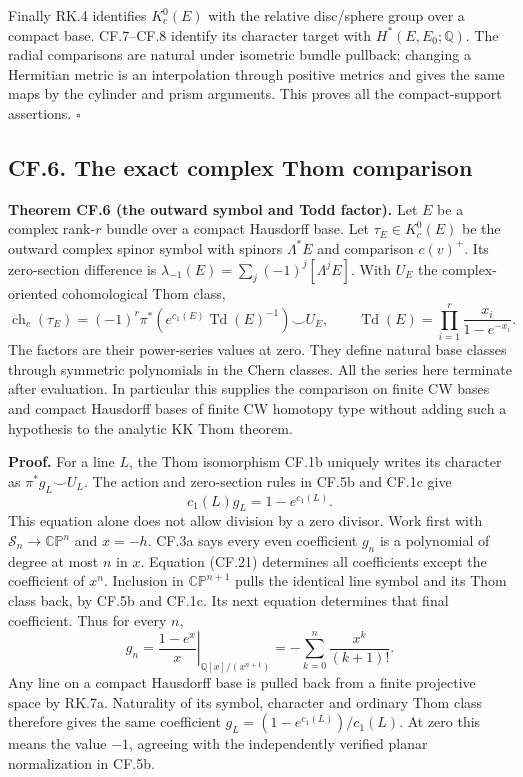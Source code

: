 \documentclass[
  11pt,
]{article}
\begin{document}
Finally RK.4 identifies \(K^0_c(E)\) with the relative disc/sphere group
over a compact base. CF.7--CF.8 identify its character target with
\(H^*(E,E_0;\mathbb Q)\). The radial comparisons are natural under
isometric bundle pullback; changing a Hermitian metric is an
interpolation through positive metrics and gives the same maps by the
cylinder and prism arguments. This proves all the compact-support
assertions. \(\square\)

\subsection{CF.6. The exact complex Thom
comparison}\label{cf.6.-the-exact-complex-thom-comparison}

\textbf{Theorem CF.6 (the outward symbol and Todd factor).} Let \(E\) be
a complex rank-\(r\) bundle over a compact Hausdorff base. Let
\(\tau_E\in K_c^0(E)\) be the outward complex spinor symbol with spinors
\(\Lambda^*E\) and comparison \(c(v)^+\). Its zero-section difference is
\(\lambda_{-1}(E)=\sum_j(-1)^j[\Lambda^jE]\). With \(U_E\) the
complex-oriented cohomological Thom class, \[
\operatorname{ch}_c(\tau_E)
=(-1)^r\pi^*\!\left(e^{c_1(E)}\operatorname{Td}(E)^{-1}\right)\smile U_E,
\qquad
\operatorname{Td}(E)=\prod_{i=1}^r\frac{x_i}{1-e^{-x_i}}.
\tag{CF.20}
\] The factors are their power-series values at zero. They define
natural base classes through symmetric polynomials in the Chern classes.
All the series here terminate after evaluation. In particular this
supplies the comparison on finite CW bases and compact Hausdorff bases
of finite CW homotopy type without adding such a hypothesis to the
analytic KK Thom theorem.

\textbf{Proof.} For a line \(L\), the Thom isomorphism CF.1b uniquely
writes its character as \(\pi^*g_L\smile U_L\). The action and
zero-section rules in CF.5b and CF.1c give \[
c_1(L)g_L=1-e^{c_1(L)}.
\tag{CF.21}
\] This equation alone does not allow division by a zero divisor. Work
first with \(\mathcal S_n\to\mathbb{CP}^n\) and \(x=-h\). CF.3a says
every even coefficient \(g_n\) is a polynomial of degree at most \(n\)
in \(x\). Equation (CF.21) determines all coefficients except the
coefficient of \(x^n\). Inclusion in \(\mathbb{CP}^{n+1}\) pulls the
identical line symbol and its Thom class back, by CF.5b and CF.1c. Its
next equation determines that final coefficient. Thus for every \(n\),
\[
g_n=\left.\frac{1-e^x}{x}\right|_{\mathbb Q[x]/(x^{n+1})}
=-\sum_{k=0}^{n}\frac{x^k}{(k+1)!}.
\tag{CF.22}
\] Any line on a compact Hausdorff base is pulled back from a finite
projective space by RK.7a. Naturality of its symbol, character and
ordinary Thom class therefore gives the same coefficient
\(g_L=(1-e^{c_1(L)})/c_1(L)\). At zero this means the value \(-1\),
agreeing with the independently verified planar normalization in CF.5b.
\end{document}
